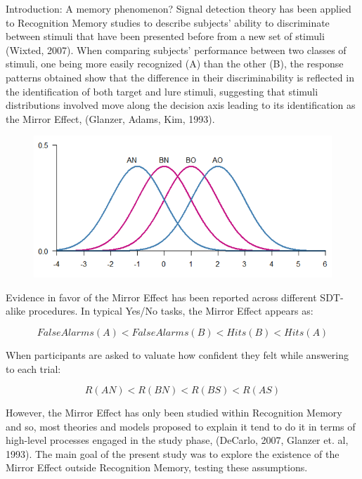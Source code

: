 \documentclass[final]{beamer}
\newlength{\onecolwid}
\begin{document}
\begin{frame}[t]
\begin{columns}[t]
\begin{column}{\onecolwid}
\begin{alertblock}{Introduction: A memory phenomenon?}
Signal detection theory has been applied to Recognition Memory studies to describe subjects’ ability to discriminate between stimuli that have been presented before from a new set of stimuli (Wixted, 2007). When comparing subjects' performance between two classes of stimuli, one being more easily recognized (A) than the other (B), the response patterns obtained show that the difference in their discriminability  is reflected in the identification of both target and lure stimuli, suggesting that stimuli distributions involved move along the decision axis leading to its identification as the Mirror Effect, (Glanzer, Adams, Kim, 1993). 
$\,$
$\;$
$\quad$
$\qquad$
\begin{figure}
\includegraphics[width=0.5\linewidth]{Figures/MirrorEffect.png}
\end{figure}

Evidence in favor of the Mirror Effect has been reported across different SDT-alike procedures. In typical Yes/No tasks, the Mirror Effect appears as:

\begin{equation}
FalseAlarms(A) < FalseAlarms(B) < Hits(B) < Hits(A)
\label{eqn:Rates}
\end{equation}

When participants are asked to valuate how confident they felt while answering to each trial:

\begin{equation}
R(AN) < R(BN) < R(BS) < R(AS)
\label{eqn:Confidence}
\end{equation}

However, the Mirror Effect has only been studied within Recognition Memory and so, most theories and models proposed to explain it tend to do it in terms of high-level processes engaged in the study phase, (DeCarlo, 2007, Glanzer et. al, 1993). The main goal of the present study was to explore the existence of the Mirror Effect outside Recognition Memory, testing these assumptions. 
\end{alertblock}




\end{column}
\end{columns}
\end{frame}
\end{document}
